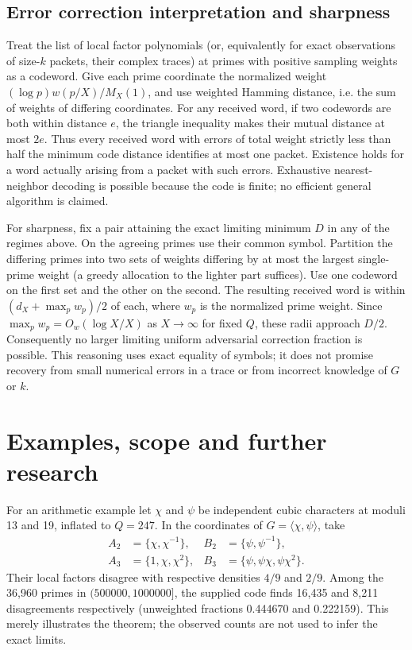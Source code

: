 \documentclass[11pt]{article}
\theoremstyle{remark}\newtheorem{remark}[theorem]{Remark}
\begin{document}
\subsection{Error correction interpretation and sharpness}
Treat the list of local factor polynomials (or, equivalently for exact observations of size-$k$ packets, their complex traces) at primes with positive sampling weights as a codeword. Give each prime coordinate the normalized weight $(\log p)w(p/X)/M_X(1)$, and use weighted Hamming distance, i.e. the sum of weights of differing coordinates. For any received word, if two codewords are both within distance $e$, the triangle inequality makes their mutual distance at most $2e$. Thus every received word with errors of total weight strictly less than half the minimum code distance identifies at most one packet. Existence holds for a word actually arising from a packet with such errors. Exhaustive nearest-neighbor decoding is possible because the code is finite; no efficient general algorithm is claimed.

For sharpness, fix a pair attaining the exact limiting minimum $D$ in any of the regimes above. On the agreeing primes use their common symbol. Partition the differing primes into two sets of weights differing by at most the largest single-prime weight (a greedy allocation to the lighter part suffices). Use one codeword on the first set and the other on the second. The resulting received word is within $(d_X+\max_p w_p)/2$ of each, where $w_p$ is the normalized prime weight. Since $\max_p w_p=O_w(\log X/X)$ as $X\to\infty$ for fixed $Q$, these radii approach $D/2$. Consequently no larger limiting uniform adversarial correction fraction is possible. This reasoning uses exact equality of symbols; it does not promise recovery from small numerical errors in a trace or from incorrect knowledge of $G$ or $k$.

\section{Examples, scope and further research}
For an arithmetic example let $\chi$ and $\psi$ be independent cubic characters at moduli 13 and 19, inflated to $Q=247$. In the coordinates of $G=\langle\chi,\psi\rangle$, take
\[
\begin{aligned}
 A_2&=\{\chi,\chi^{-1}\},&B_2&=\{\psi,\psi^{-1}\},\\
 A_3&=\{1,\chi,\chi^2\},&B_3&=\{\psi,\psi\chi,\psi\chi^2\}.
\end{aligned}
\]
Their local factors disagree with respective densities $4/9$ and $2/9$. Among the 36,960 primes in $(500000,1000000]$, the supplied code finds 16,435 and 8,211 disagreements respectively (unweighted fractions 0.444670 and 0.222159). This merely illustrates the theorem; the observed counts are not used to infer the exact limits.
\end{document}
